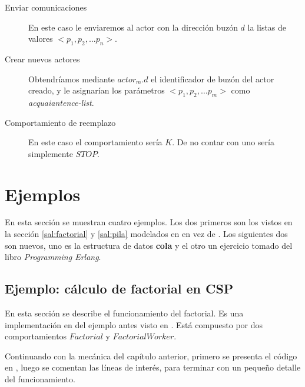 \begin{description}
\item [Enviar comunicaciones] En este caso le enviaremos al actor con la dirección buzón $d$ la listas de valores $<p_1, p_2, \ldots p_n>$. 
\item [Crear nuevos actores] Obtendríamos mediante $actor_m.d$ el identificador de buzón del actor creado, y le asignarían los parámetros $<p_1, p_2, \ldots p_m>$ como \textit{acquaiantence-list}.
\item [Comportamiento de reemplazo] En este caso el comportamiento sería $K$. De no contar con uno sería simplemente $STOP$.
\end{description}

\section{Ejemplos}

En esta sección se muestran cuatro ejemplos. Los dos primeros son los vistos en la sección \ref{sal:factorial} y \ref{sal:pila} modelados en \CSP en vez de \SAL. Los siguientes dos son nuevos, uno es la estructura de datos \textbf{cola} y el otro un ejercicio tomado del libro \textit{Programming Erlang}\cite{Cesarini:2009:EP:1717841}.

\subsection{Ejemplo: cálculo de factorial en CSP}
En esta sección se describe el funcionamiento del factorial. Es una implementación en \CSP del ejemplo antes visto en \SAL. Está compuesto por dos comportamientos $Factorial$ y $FactorialWorker$.

Continuando con la mecánica del capítulo anterior, primero se presenta el código en \CSP, luego se comentan las líneas de interés, para terminar con un pequeño detalle del funcionamiento.

